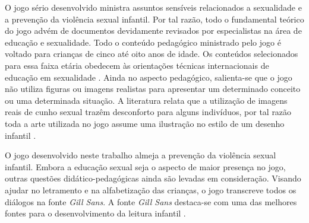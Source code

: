 O jogo sério desenvolvido ministra assuntos sensíveis relacionados a sexualidade e a prevenção da violência sexual infantil. Por tal razão, todo o fundamental teórico do jogo advém de documentos devidamente revisados por especialistas na área de educação e sexualidade. Todo o conteúdo pedagógico ministrado pelo jogo é voltado para crianças de cinco até oito anos de idade. Os conteúdos selecionados para essa faixa etária obedecem às orientações técnicas internacionais de educação em sexualidade \cite{women2018international}. Ainda no aspecto pedagógico, salienta-se que o jogo não utiliza figuras ou imagens realistas para apresentar um determinado conceito ou uma determinada situação. A literatura relata que a utilização de imagens reais de cunho sexual trazêm desconforto para alguns indivíduos, por tal razão toda a arte utilizada no jogo assume uma ilustração no estilo de um desenho infantil \cite{jogo2020Albert}.


O jogo desenvolvido neste trabalho almeja a prevenção da violência sexual infantil. Embora a educação sexual seja o aspecto de maior presença no jogo, outras questões didático-pedagógicas ainda são levadas em consideração. Visando ajudar no letramento e na alfabetização das crianças, o jogo transcreve todos os diálogos na fonte \textit{Gill Sans}. A fonte \textit{Gill Sans} destaca-se com uma das melhores fontes para o desenvolvimento da leitura infantil \cite{lourencco2011tipografia}. 


